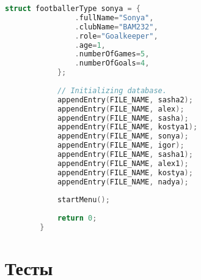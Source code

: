 \documentclass[12pt]{article}
\begin{document}
\begin{lstlisting}[language=C]
			struct footballerType sonya = {
				.fullName="Sonya",
				.clubName="BAM232",
				.role="Goalkeeper",
				.age=1,
				.numberOfGames=5,
				.numberOfGoals=4,
			};
			
			// Initializing database.
			appendEntry(FILE_NAME, sasha2);
			appendEntry(FILE_NAME, alex);
			appendEntry(FILE_NAME, sasha);
			appendEntry(FILE_NAME, kostya1);
			appendEntry(FILE_NAME, sonya);
			appendEntry(FILE_NAME, igor);
			appendEntry(FILE_NAME, sasha1);
			appendEntry(FILE_NAME, alex1);
			appendEntry(FILE_NAME, kostya);
			appendEntry(FILE_NAME, nadya);
			
			startMenu();
			
			return 0;
		}
	\end{lstlisting}
	
	\newpage
	
	\section*{Тесты}
	
	
\end{document}
